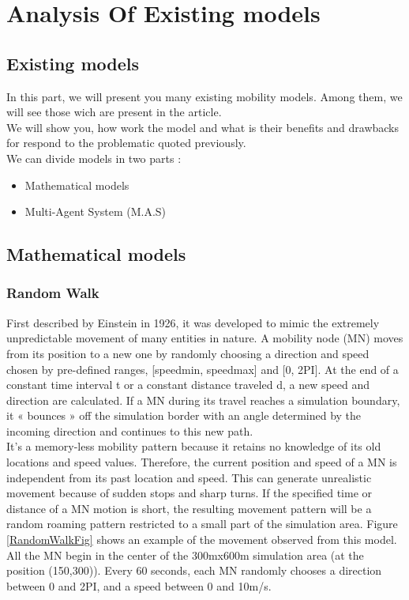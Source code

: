 \chapter{Analysis Of Existing models}

\section{Existing models}

In this part, we will present you many existing mobility models. Among them, we will see those wich are present in the article.\\ 
We will show you, how work the model and what is their benefits and drawbacks for respond to the problematic quoted previously.\\

We can divide models in two parts :
\begin{itemize}
\item Mathematical models
\item Multi-Agent System (M.A.S)
\end{itemize}

\section{Mathematical models}
\subsection{Random Walk}

First described by Einstein in 1926, it was developed to mimic the extremely unpredictable movement of many entities in nature. A mobility node (MN) moves from its position to a new one by randomly choosing a direction and speed chosen by pre-defined ranges, [speedmin, speedmax] and [0, 2PI]. At the end of a constant time interval t or a constant distance traveled d, a new speed and direction are calculated. If a MN during its travel reaches a simulation boundary, it « bounces » off the simulation border with an angle determined by the incoming direction and continues to this new path.\\
It's a memory-less mobility pattern because it retains no knowledge of its old locations and speed values. Therefore, the current position and speed of a MN is independent from its past location and speed. This can generate unrealistic movement because of sudden stops and sharp turns. If the specified time or distance of a MN motion is short, the resulting movement pattern will be a random roaming pattern restricted to a small part of the simulation area. Figure \ref{RandomWalkFig} shows an example of the movement observed from this model. All the MN begin in the center of the 300mx600m simulation area (at the position (150,300)). Every 60 seconds, each MN randomly chooses a direction between 0 and 2PI, and a speed between 0 and 10m/s.\\


